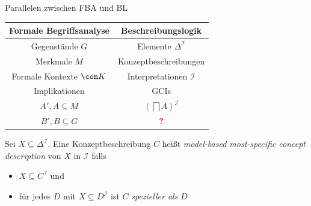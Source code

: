 \documentclass[ngerman]{beamer}
\newcommand{\pseudocite}[1]{\textcolor{gray}{[#1]}}
\begin{document}
\begin{frame}

  \onslide<+->

  \begin{block}{Parallelen zwischen FBA und BL}
    \begin{center}
      \begin{tabular}{c|c}
        Formale Begriffsanalyse & Beschreibungslogik \\
        \midrule\onslide<+->
        Gegenstände $G$ & Elemente $\Delta^{\mathcal{I}}$ \\\onslide<+->
        Merkmale $M$ & Konzeptbeschreibungen \\\onslide<+->
        Formale Kontexte $\con K$ & Interpretationen $\mathcal{I}$ \\\onslide<+->
        Implikationen & GCIs \\\onslide<+->
        $A', A \subseteq M$ & $(\bigsqcap A)^{\mathcal{I}}$ \\\onslide<+->
        $B', B \subseteq G$ & \textcolor{red}{\textbf{?}}
      \end{tabular}
    \end{center}
  \end{block}

  \onslide<+->

  \begin{Definition}[\pseudocite{Baader, Distel 2009}]
    Sei $X \subseteq \Delta^{\mathcal{I}}$. \onslide<+-> Eine Konzeptbeschreibung $C$
    heißt \emph{model-based most-specific concept description} von $X$ in $\mathcal{I}$
    falls
    \begin{itemize}
    \item<+-> $X \subseteq C^{\mathcal{I}}$ und
    \item<+-> für jedes $D$ mit $X \subseteq D^{\mathcal{I}}$ ist $C$ \emph{spezieller
        als} $D$
    \end{itemize}
  \end{Definition}

\end{frame}




  
\end{document}
